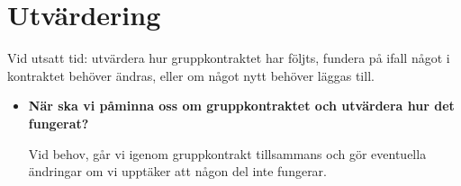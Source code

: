 \documentclass{mall}
\begin{document}
\section{Utvärdering}

Vid utsatt tid: utvärdera hur gruppkontraktet har följts, fundera på ifall något i kontraktet behöver ändras, eller om något nytt behöver läggas till.

\begin{itemize}
\item \textbf{När ska vi påminna oss om gruppkontraktet och utvärdera hur det fungerat?}

  Vid behov, går vi igenom gruppkontrakt tillsammans och gör eventuella ändringar om vi upptäker att någon del inte fungerar.

\end{itemize}
\end{document}
